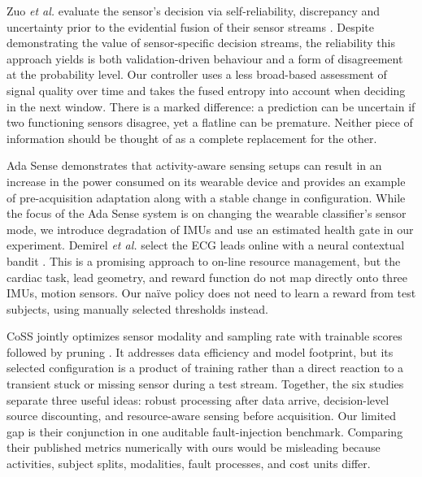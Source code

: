 \documentclass[conference]{IEEEtran}
\begin{document}
Zuo \emph{et al.} evaluate the sensor's decision via self-reliability, discrepancy and uncertainty prior to the evidential fusion of their sensor streams \cite{zuo}. Despite demonstrating the value of sensor-specific decision streams, the reliability this approach yields is both validation-driven behaviour and a form of disagreement at the probability level. Our controller uses a less broad-based assessment of signal quality over time and takes the fused entropy into account when deciding in the next window. There is a marked difference: a prediction can be uncertain if two functioning sensors disagree, yet a flatline can be premature. Neither piece of information should be thought of as a complete replacement for the other.

Ada Sense demonstrates that activity-aware sensing setups can result in an increase in the power consumed on its wearable device \cite{adasense} and provides an example of pre-acquisition adaptation along with a stable change in configuration. While the focus of the Ada Sense system is on changing the wearable classifier's sensor mode, we introduce degradation of IMUs and use an estimated health gate in our experiment. Demirel \emph{et al.} select the ECG leads online with a neural contextual bandit \cite{demirel}. This is a promising approach to on-line resource management, but the cardiac task, lead geometry, and reward function do not map directly onto three IMUs, motion sensors. Our na{\"i}ve policy does not need to learn a reward from test subjects, using manually selected thresholds instead.

CoSS jointly optimizes sensor modality and sampling rate with trainable scores followed by pruning \cite {coss}. It addresses data efficiency and model footprint, but its selected configuration is a product of training rather than a direct reaction to a transient stuck or missing sensor during a test stream. Together, the six studies separate three useful ideas: robust processing after data arrive, decision-level source discounting, and resource-aware sensing before acquisition. Our limited gap is their conjunction in one auditable fault-injection benchmark. Comparing their published metrics numerically with ours would be misleading because activities, subject splits, modalities, fault processes, and cost units differ.
\end{document}

